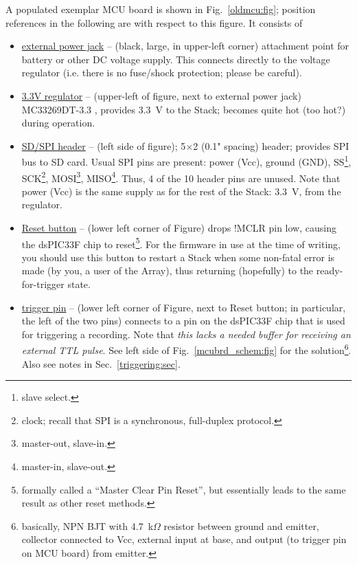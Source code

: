 \documentclass[letterpaper]{article}
\begin{document}
A populated exemplar MCU board is shown in Fig.~\ref{oldmcu:fig};
position references in the following are with respect to this
figure. It consists of
\begin{itemize}
\item \underline{external power jack} -- (black, large, in upper-left
  corner) attachment point for battery or other DC voltage
  supply. This connects directly to the voltage regulator (i.e. there
  is no fuse/shock protection; please be careful).

\item \underline{3.3V regulator} -- (upper-left of figure, next to
  external power jack) MC33269DT-3.3 , provides 3.3~V to the Stack;
  becomes quite hot (too hot?) during operation.

\item \underline{SD/SPI header} -- (left side of figure); 5$\times$2
  (0.1" spacing) header; provides SPI bus to SD card. Usual SPI pins
  are present: power (Vcc), ground (GND), SS\footnote{slave select.},
  SCK\footnote{clock; recall that SPI is a synchronous, full-duplex
    protocol.}, MOSI\footnote{master-out, slave-in.},
  MISO\footnote{master-in, slave-out.}. Thus, 4 of the 10 header pins
  are unused. Note that power (Vcc) is the same supply as for the rest
  of the Stack: 3.3~V, from the regulator.

\item \underline{Reset button} -- (lower left corner of Figure) drops
  \mbox{!MCLR} pin low, causing the dsPIC33F chip to
  reset\footnote{formally called a ``Master Clear Pin Reset'', but
    essentially leads to the same result as other reset methods.}. For
  the firmware in use at the time of writing, you should use this
  button to restart a Stack when some non-fatal error is made (by you,
  a user of the Array), thus returning (hopefully) to the
  ready-for-trigger state.

\item \underline{trigger pin} -- (lower left corner of Figure, next to
  Reset button; in particular, the left of the two pins) connects to a
  pin on the dsPIC33F chip that is used for triggering a
  recording. Note that \textit{this lacks a needed buffer for
    receiving an external TTL pulse}. See left side of
  Fig.~\ref{mcubrd_schem:fig} for the solution\footnote{basically, NPN
    BJT with 4.7~k$\Omega$ resistor between ground and emitter,
    collector connected to Vcc, external input at base, and output (to
    trigger pin on MCU board) from emitter.}. Also see notes in
  Sec.~\ref{triggering:sec}.


\end{itemize}
\end{document}
